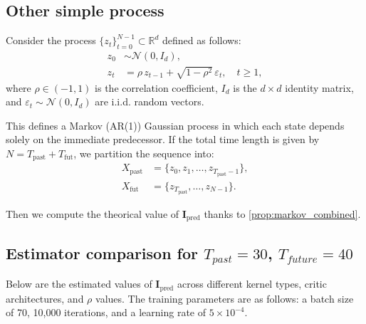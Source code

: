 \documentclass{article}
\begin{document}
\subsection{Other simple process}\label{subsection:gaussian_process_toy}
Consider the process \( \{z_t\}_{t=0}^{N-1} \subset \mathbb{R}^d \) defined as follows:
\begin{align}
    z_0 &\sim \mathcal{N}(0, I_d), \\
    z_t &= \rho\, z_{t-1} + \sqrt{1 - \rho^2}\,\varepsilon_t,\quad t \geq 1,
\end{align}
where \( \rho \in (-1,1) \) is the correlation coefficient, \( I_d \) is the \( d \times d \) identity matrix, and \( \varepsilon_t \sim \mathcal{N}(0, I_d) \) are i.i.d. random vectors.


This defines a Markov (AR(1)) Gaussian process in which each state depends solely on the immediate predecessor. If the total time length is given by \( N = T_{\text{past}} + T_{\text{fut}} \), we partition the sequence into:
\begin{align*}
X_{\text{past}} &= \{ z_0, z_1, \dots, z_{T_{\text{past}} - 1} \}, \\
X_{\text{fut}} &= \{ z_{T_{\text{past}}}, \dots, z_{N-1} \}.
\end{align*}

Then we compute the theorical value of $\mathbf{I}_{\text{pred}}$ thanks to \ref{prop:markov_combined}.

\subsection{Estimator comparison for $T_{past} = 30$, $T_{future} = 40$ }

Below are the estimated values of $\mathbf{I}_{\text{pred}}$ across different kernel types, critic architectures, and $\rho$ values. The training parameters are as follows: a batch size of 70, 10{,}000 iterations, and a learning rate of $5 \times 10^{-4}$.
\end{document}
